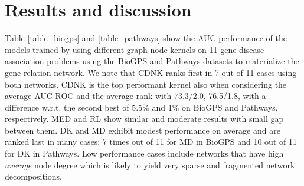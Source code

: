 \documentclass[review]{elsarticle}
\begin{document}
\section{Results and discussion}
Table \ref{table_biogps} and \ref{table_pathways} show the AUC performance of the models trained by using different graph node kernels on 11 gene-disease association problems using the BioGPS and Pathways datasets to materialize the gene relation network. We note that CDNK ranks first in 7 out of 11 cases using  both networks. CDNK is the top performant kernel also when considering the average AUC ROC and the average rank with 73.3/2.0, 76.5/1.8, with a difference w.r.t. the second best of 5.5$\%$ and 1$\%$ on BioGPS and Pathways, respectively. MED and RL show similar and moderate results with small gap between them. DK and MD exhibit modest performance on average and  are ranked last in many cases: 7 times out of 11 for MD in BioGPS and 10 out of 11 for DK in Pathways. Low performance cases include networks that have high {\em average} node degree which is likely to yield very sparse and fragmented network decompositions.
\end{document}
